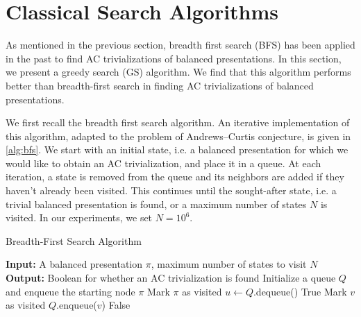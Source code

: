 
\section{Classical Search Algorithms} \label{sec:search}
As mentioned in the previous section, breadth first search (BFS) has been applied in the past to find AC trivializations of balanced presentations. In this section, we present a greedy search (GS) algorithm. We find that this algorithm performs better than breadth-first search in finding AC trivializations of balanced presentations.
\newline

We first recall the breadth first search algorithm. An iterative implementation of this algorithm, adapted to the problem of Andrews--Curtis conjecture, is given in \autoref{alg:bfs}. We start with an initial state, i.e. a balanced presentation for which we would like to obtain an AC trivialization, and place it in a queue. At each iteration, a state is removed from the queue and its neighbors are added if they haven't already been visited. This continues until the sought-after state, i.e. a trivial balanced presentation is found, or a maximum number of states $N$ is visited. In our experiments, we set $N=10^6$.
\newline

\begin{algorithm}
\caption{Breadth-First Search Algorithm}\label{alg:bfs}
\begin{algorithmic}[1] %
\State \textbf{Input:} A balanced presentation $\pi$, maximum number of states to visit $N$
\State \textbf{Output:} Boolean for whether an AC trivialization is found
\State Initialize a queue $Q$ and enqueue the starting node $\pi$
\State Mark $\pi$ as visited
    \State $u \gets Q$.dequeue() 
            \State \Return True 
        \EndIf
            \State Mark $v$ as visited
            \State $Q$.enqueue($v$) 
        \EndIf
    \EndFor
\EndWhile
\State \Return False 
\end{algorithmic}
\end{algorithm}

